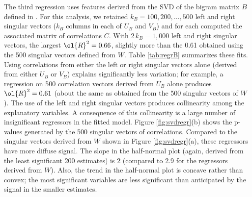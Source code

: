 \documentclass[10pt]{article}
\begin{document}
 The third regression uses features derived from the SVD of the bigram matrix
 $B$ defined in .  For this analysis, we retained $k_B=100, 200, \ldots, 500$ left and right singular vectors ($k_B$ columns in each of $U_B$ and $V_B$) and for each computed the associated matrix of correlations $C$.  With $2 \, k_B = 1,000$ left and right singular vectors, the largest $\ol{R}^2 = 0.66$, slightly more than the 0.61 obtained using the 500 singular vectors defined from $W$.  Table \ref{tab:regrB} summarizes these fits.  Using correlations from either the left or right singular vectors alone (derived from either $U_B$ or $V_B$) explains significantly less variation; for example, a regression on 500 correlation vectors derived from  $U_B$ alone  produces $\ol{R}^2 = 0.61$ (about the same as obtained from the 500 singular vectors of $W$). The use of the left and right singular vectors produces collinearity among the explanatory variables.  A consequence of this collinearity is a large number of insignificant regressors in the fitted model.  Figure \ref{fig:svdregr}(b) shows the p-values generated by the 500 singular vectors of correlations.  Compared to the singular vectors derived from $W$ shown in Figure \ref{fig:svdregr}(a), these regressors have more diffuse signal.  The slope in the half-normal plot (again, derived from the least significant 200 estimates) is 2 (compared to 2.9 for the regressors derived from $W$).  Also, the trend in the half-normal plot is concave rather than convex; the most significant variables are less significant than anticipated by the signal in the smaller estimates.
\end{document}
